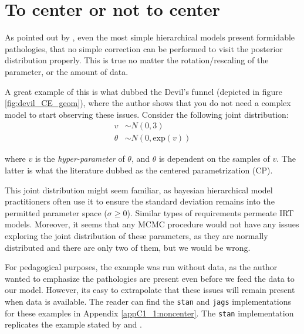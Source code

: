 
\section{To center or not to center} \label{sect:noncenter}

As pointed out by \citet{Betancourt_et_al_2013}, even the most simple hierarchical models present formidable pathologies, that no simple correction can be performed to visit the posterior distribution properly. This is true no matter the rotation/rescaling of the parameter, or the amount of data. 

A great example of this is what \citet{McElreath_2020} dubbed the Devil's funnel (depicted in figure \ref{fig:devil_CE_geom}), where the author shows that you do not need a complex model to start observing these issues. Consider the following joint distribution:
%
\begin{equation} \label{eq:devil}
	\begin{split}	
		v &\sim N(0, 3) \\
		\theta &\sim N(0, \text{exp}(v))
	\end{split}
\end{equation}

\noindent where $v$ is the \textit{hyper-parameter} of $\theta$, and $\theta$ is dependent on the samples of $v$. The latter is what the literature dubbed as the centered parametrization (CP).

This joint distribution might seem familiar, as bayesian hierarchical model practitioners often use it to ensure the standard deviation remains into the permitted parameter space ($\sigma \geq 0$). Similar types of requirements permeate IRT models. Moreover, it seems that any MCMC procedure would not have any issues exploring the joint distribution of these parameters, as they are normally distributed and there are only two of them, but we would be wrong. 

For pedagogical purposes, the example was run without data, as the author wanted to emphasize the pathologies are present even before we feed the data to our model. However, its easy to extrapolate that these issues will remain present when data is available. The reader can find the \texttt{stan} and \texttt{jags} implementations for these examples in Appendix \ref{appC1_1:noncenter}. The \texttt{stan} implementation replicates the example stated by \citet{Betancourt_et_al_2013} and \citet{McElreath_2020}.

